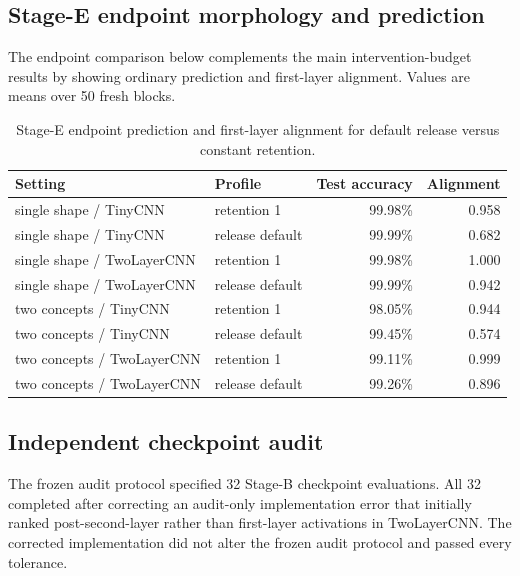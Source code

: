 \subsection{Stage-E endpoint morphology and prediction}\label{app:stage-e-endpoints}

The endpoint comparison below complements the main intervention-budget results by showing ordinary prediction and first-layer alignment. Values are means over 50 fresh blocks.

\begin{table}[h]
\centering
\small
\begin{tabular}{llrr}
\toprule
Setting & Profile & Test accuracy & Alignment \\
\midrule
single shape / TinyCNN & retention 1 & 99.98\% & 0.958 \\
single shape / TinyCNN & release default & 99.99\% & 0.682 \\
single shape / TwoLayerCNN & retention 1 & 99.98\% & 1.000 \\
single shape / TwoLayerCNN & release default & 99.99\% & 0.942 \\
two concepts / TinyCNN & retention 1 & 98.05\% & 0.944 \\
two concepts / TinyCNN & release default & 99.45\% & 0.574 \\
two concepts / TwoLayerCNN & retention 1 & 99.11\% & 0.999 \\
two concepts / TwoLayerCNN & release default & 99.26\% & 0.896 \\
\bottomrule
\end{tabular}
\caption{Stage-E endpoint prediction and first-layer alignment for default release versus constant retention.}
\label{tab:stage-e-endpoints}
\end{table}

\subsection{Independent checkpoint audit}\label{app:audit}

The frozen audit protocol specified 32 Stage-B checkpoint evaluations. All 32 completed after correcting an audit-only implementation error that initially ranked post-second-layer rather than first-layer activations in TwoLayerCNN. The corrected implementation did not alter the frozen audit protocol and passed every tolerance.

